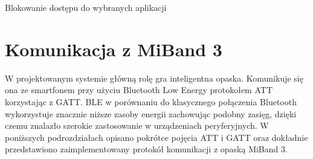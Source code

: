 \begin{algorithm}[H]
    \DontPrintSemicolon
    \SetAlgoLined
    \caption{Blokowanie dostępu do wybranych aplikacji} 
    \BlankLine
    \BlankLine
\end{algorithm}

\section{Komunikacja z MiBand 3}
W projektowanym systemie główną rolę gra inteligentna opaska. Komunikuje się ona ze smartfonem przy użyciu Bluetooth Low Energy protokołem ATT korzystając z GATT. BLE w porównaniu do klasycznego połączenia Bluetooth wykorzystuje znacznie niższe zasoby energii zachowując podobny zasięg, dzięki czemu znalazło szerokie zastosowanie w urządzeniach peryferyjnych. W poniższych podrozdziałach opisano pokrótce pojęcia ATT i GATT oraz dokładnie przedstawiono zaimplementowany protokół komunikacji z opaską MiBand 3.
